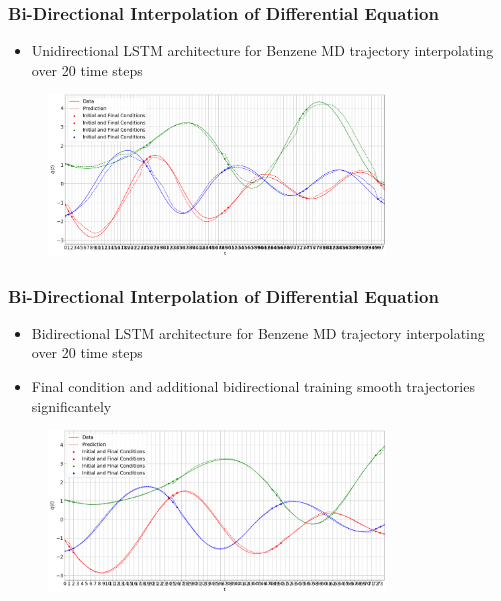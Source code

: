 \documentclass[usenames, dvipsnames, t]{beamer}
\begin{document}
\begin{frame}
	\frametitle{Bi-Directional Interpolation of Differential Equation}
	\begin{itemize}
		 \item Unidirectional LSTM architecture for Benzene MD trajectory interpolating over 20 time steps
	\end{itemize}
	\begin{figure}
		 \centering
		 \includegraphics[width=0.8\textwidth]{ExampleTrajectory.png}
	\end{figure}
\end{frame}

\begin{frame}
	\frametitle{Bi-Directional Interpolation of Differential Equation}
	\begin{itemize}
		 \item Bidirectional LSTM architecture for Benzene MD trajectory interpolating over 20 time steps
		 \item Final condition and additional bidirectional training smooth trajectories significantely
	\end{itemize}
	\begin{figure}
		 \centering
		 \includegraphics[width=0.8\textwidth]{ExampleTrajectoryBi.png}
	\end{figure}
\end{frame}
\end{document}
